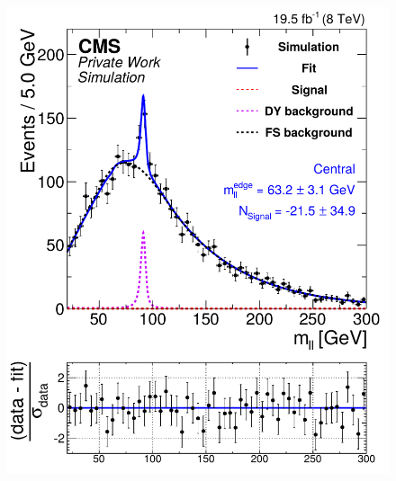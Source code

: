 \begin{figure}[hbp]
  \centering
  \begin{minipage}[t]{0.49\textwidth}
    \includegraphics[width=\textwidth]{plots/results/fit/mcFits/fit2012_ETHTriangle_SignalInclusive_Combined_Full2012_ETHTriangle_MC_Central.pdf}
  \end{minipage}
  \begin{minipage}[t]{0.49\textwidth}

\end{minipage}
\end{figure}
